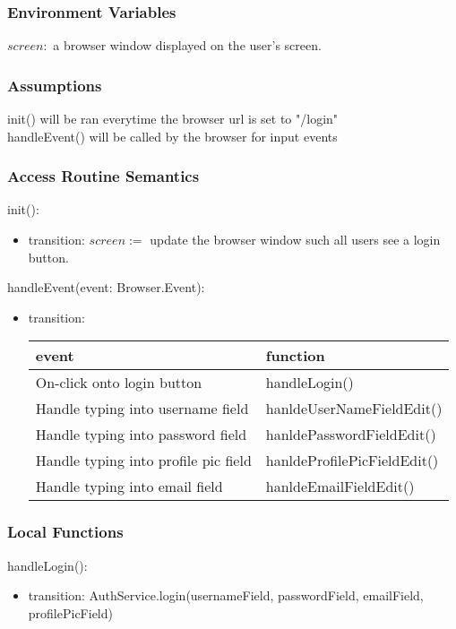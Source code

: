 \documentclass[12pt, titlepage]{article}
\begin{document}
\subsubsection{Environment Variables}
$screen: $ a browser window displayed on the user's screen.

\subsubsection{Assumptions}

init() will be ran everytime the browser url is set to "/login"\\
handleEvent() will be called by the browser for input events

\subsubsection{Access Routine Semantics}
\noindent init():
\begin{itemize}
\item transition: $screen := $ update the browser window such all users see a login button.
\end{itemize}

\noindent handleEvent(event: Browser.Event):
\begin{itemize}
\item transition: \begin{tabular}{p{5cm} p{4cm}}
\hline
\textbf{event} & \textbf{function} \\
\hline
On-click onto login button & handleLogin() \\
Handle typing into username field  & hanldeUserNameFieldEdit() \\
Handle typing into password field & hanldePasswordFieldEdit() \\
Handle typing into profile pic field & hanldeProfilePicFieldEdit() \\
Handle typing into email field & hanldeEmailFieldEdit() \\
\hline
\end{tabular}
    
\end{itemize}

\subsubsection{Local Functions}

\noindent handleLogin():
\begin{itemize}
\item transition: AuthService.login(usernameField, passwordField, emailField, profilePicField)
\end{itemize}
\end{document}
